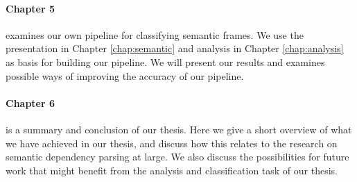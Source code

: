 \paragraph{Chapter 5} examines our own pipeline for classifying semantic frames. We use the presentation in Chapter \ref{chap:semantic} and analysis in Chapter \ref{chap:analysis} as basis for building our pipeline. We will present our results and examines possible ways of improving the accuracy of our pipeline.

\paragraph{Chapter 6} is a summary and conclusion of our thesis. Here we give a short overview of what we have achieved in our thesis, and discuss how this relates to the research on semantic dependency parsing at large. We also discuss the possibilities for future work that might benefit from the analysis and classification task of our thesis.